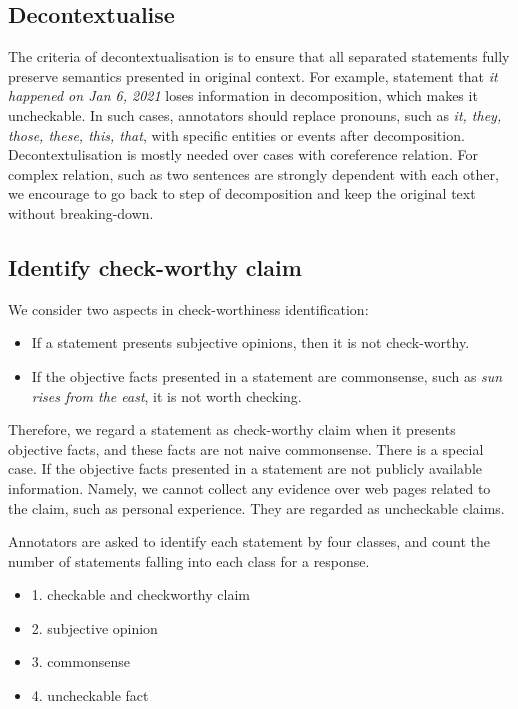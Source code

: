\documentclass[11pt]{article}
\begin{document}
\subsection{Decontextualise}
The criteria of decontextualisation is to ensure that all separated statements fully preserve semantics presented in original context.
For example, statement that \textit{it happened on Jan 6, 2021} loses information in decomposition, which makes it uncheckable. 
In such cases, annotators should replace pronouns, such as \textit{it, they, those, these, this, that}, with specific entities or events after decomposition.
Decontextulisation is mostly needed over cases with co\-reference relation.
For complex relation, such as two sentences are strongly dependent with each other, we encourage to go back to step of decomposition and keep the original text without breaking-down.


\subsection{Identify check-worthy claim}
We consider two aspects in check-worthiness identification:
\begin{itemize}
    \item If a statement presents subjective opinions, then it is not check-worthy. %
    \item If the objective facts presented in a statement are commonsense, such as \textit{sun rises from the east}, it is not worth checking. 
\end{itemize}
Therefore, we regard a statement as check-worthy claim when it presents objective facts, and these facts are not naive commonsense.
There is a special case. If the objective facts presented in a statement are not publicly available information. Namely, we cannot collect any evidence over web pages related to the claim, such as personal experience.
They are regarded as uncheckable claims.

Annotators are asked to identify each statement by four classes, and count the number of statements falling into each class for a response.
\begin{itemize}
    \item[] 1. checkable and checkworthy claim
    \item[] 2. subjective opinion
    \item[] 3. commonsense
    \item[] 4. uncheckable fact
\end{itemize}
\end{document}

